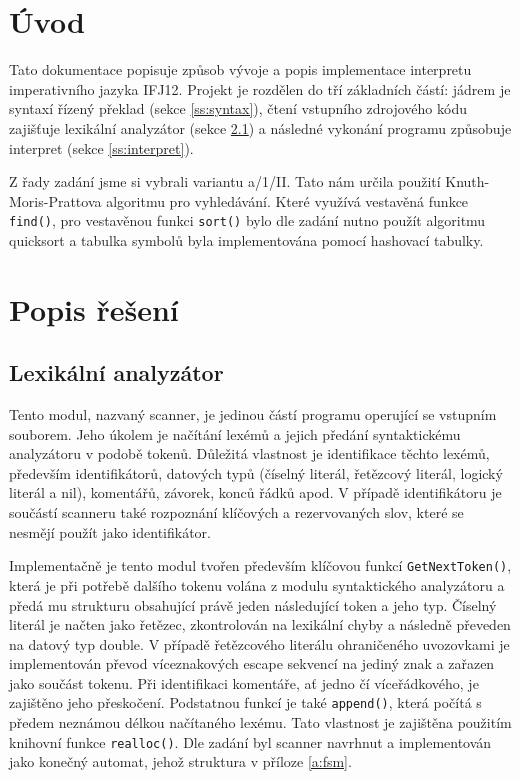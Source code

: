 \documentclass[a4paper, 12pt]{article}[5.12.2012]
\begin{document}


\tableofcontents
\thispagestyle{empty}
\newpage
\setcounter{page}{1}
\section{Úvod} \label{s:uvod}
Tato dokumentace popisuje způsob vývoje a popis implementace interpretu imperativního jazyka
IFJ12. Projekt je rozdělen do tří základních částí: jádrem je syntaxí řízený překlad
(sekce \ref{ss:syntax}), čtení vstupního zdrojového kódu zajišťuje lexikální analyzátor
(sekce \ref{ss:lex}) a následné vykonání programu způsobuje interpret (sekce \ref{ss:interpret}).

Z řady zadání jsme si vybrali variantu a/1/II. Tato nám určila použití Knuth-Moris-Prattova 
algoritmu pro vyhledávání. Které využívá vestavěná funkce \texttt{find()}, pro vestavěnou funkci \texttt{sort()} 
bylo dle zadání nutno použít algoritmu quicksort a tabulka symbolů byla implementována pomocí hashovací tabulky.

\section{Popis řešení} \label{s:reseni}
\subsection{Lexikální analyzátor} \label{ss:lex}
Tento modul, nazvaný scanner, je jedinou částí programu operující se vstupním souborem. Jeho 
úkolem je načítání lexémů a jejich předání syntaktickému analyzátoru v podobě tokenů. 
Důležitá vlastnost je identifikace těchto lexémů, především identifikátorů, datových typů 
(číselný literál, řetězcový literál, logický literál a nil), komentářů, závorek, konců řádků apod. 
V případě identifikátoru je součástí scanneru také rozpoznání klíčových a rezervovaných slov, 
které se nesmějí použít jako identifikátor.

Implementačně je tento modul tvořen především klíčovou funkcí \texttt{GetNextToken()}, která je při 
potřebě dalšího tokenu volána z modulu syntaktického analyzátoru a předá mu strukturu 
obsahující právě jeden následující token a jeho typ. Číselný literál je načten jako řetězec, 
zkontrolován na lexikální chyby a následně převeden na datový typ double. V případě řetězcového 
literálu ohraničeného uvozovkami je implementován převod víceznakových escape sekvencí na 
jediný znak a zařazen jako součást tokenu. Při identifikaci komentáře, ať jedno čí víceřádkového, 
je zajištěno jeho přeskočení. Podstatnou funkcí je také \texttt{append()}, která počítá s předem neznámou 
délkou načítaného lexému. Tato vlastnost je zajištěna použitím knihovní funkce \texttt{realloc()}. 
Dle zadání byl scanner navrhnut a implementován jako konečný automat, jehož struktura v příloze \ref{a:fsm}.
\end{document}

